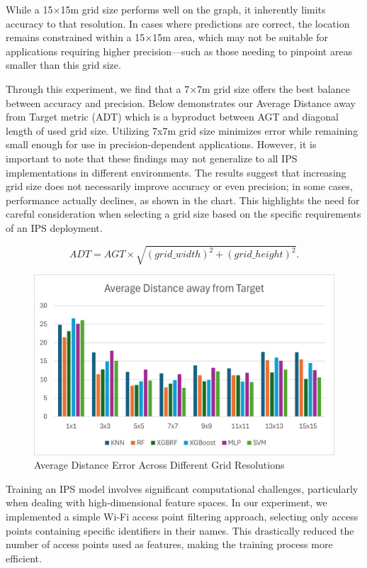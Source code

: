 \documentclass[runningheads]{llncs}
\begin{document}
While a 15×15m grid size performs well on the graph, it inherently limits accuracy to that resolution. In cases where predictions are correct, the location remains constrained within a 15×15m area, which may not be suitable for applications requiring higher precision—such as those needing to pinpoint areas smaller than this grid size.

Through this experiment, we find that a 7×7m grid size offers the best balance between accuracy and precision. Below demonstrates our Average Distance away from Target metric (ADT) which is a byproduct between AGT and diagonal length of used grid size. Utilizing 7x7m grid size minimizes error while remaining small enough for use in precision-dependent applications. However, it is important to note that these findings may not generalize to all IPS implementations in different environments. The results suggest that increasing grid size does not necessarily improve accuracy or even precision; in some cases, performance actually declines, as shown in the chart. This highlights the need for careful consideration when selecting a grid size based on the specific requirements of an IPS deployment.

\begin{equation}
	ADT = AGT \times \sqrt{(grid\_width)^2 + (grid\_height)^2}.
\end{equation}



\begin{figure}[htbp]
	\centerline{\includegraphics[scale=0.65]{image2.png}}
	\caption{Average Distance Error Across Different Grid Resolutions}
	\label{fig:Avg_dis_err}
\end{figure}



Training an IPS model involves significant computational challenges, particularly when dealing with high-dimensional feature spaces. In our experiment, we implemented a simple Wi-Fi access point filtering approach, selecting only access points containing specific identifiers in their names. This drastically reduced the number of access points used as features, making the training process more efficient.
\end{document}
